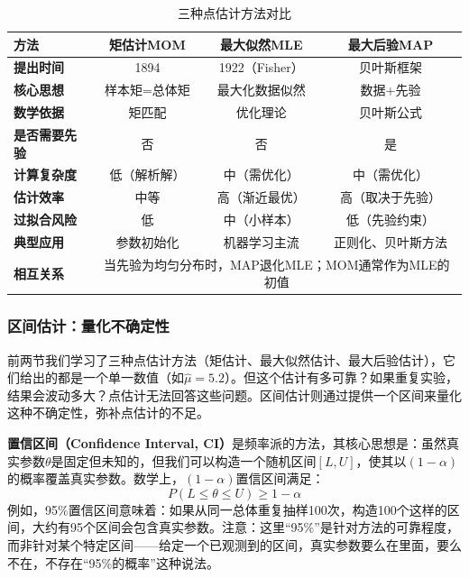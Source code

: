 \begin{table}[htbp]
\centering
\caption{三种点估计方法对比}
\label{tab:三种点估计方法对比}
\begin{tabular}{l|ccc}
\hline
\textbf{方法} & \textbf{矩估计MOM} & \textbf{最大似然MLE} & \textbf{最大后验MAP} \\
\hline
\textbf{提出时间} & 1894 & 1922（Fisher） & 贝叶斯框架 \\
\textbf{核心思想} & 样本矩=总体矩 & 最大化数据似然 & 数据+先验 \\
\textbf{数学依据} & 矩匹配 & 优化理论 & 贝叶斯公式 \\
\textbf{是否需要先验} & 否 & 否 & 是 \\
\textbf{计算复杂度} & 低（解析解） & 中（需优化） & 中（需优化） \\
\textbf{估计效率} & 中等 & 高（渐近最优） & 高（取决于先验） \\
\textbf{过拟合风险} & 低 & 中（小样本） & 低（先验约束） \\
\textbf{典型应用} & 参数初始化 & 机器学习主流 & 正则化、贝叶斯方法 \\
\hline
\textbf{相互关系} & \multicolumn{3}{c}{当先验为均匀分布时，MAP退化MLE；MOM通常作为MLE的初值} \\
\hline
\end{tabular}
\end{table}

\subsubsection{区间估计：量化不确定性}

前两节我们学习了三种点估计方法（矩估计、最大似然估计、最大后验估计），它们给出的都是一个单一数值（如$\hat{\mu}=5.2$）。但这个估计有多可靠？如果重复实验，结果会波动多大？点估计无法回答这些问题。区间估计则通过提供一个区间来量化这种不确定性，弥补点估计的不足。

\textbf{置信区间（Confidence Interval, CI）}是频率派的方法，其核心思想是：虽然真实参数$\theta$是固定但未知的，但我们可以构造一个随机区间$[L, U]$，使其以$(1-\alpha)$的概率覆盖真实参数。数学上，$(1-\alpha)$置信区间满足：
\begin{equation}
P(L \leq \theta \leq U) \geq 1-\alpha
\end{equation}
例如，95\%置信区间意味着：如果从同一总体重复抽样100次，构造100个这样的区间，大约有95个区间会包含真实参数。注意：这里``95\%''是针对方法的可靠程度，而非针对某个特定区间——给定一个已观测到的区间，真实参数要么在里面，要么不在，不存在``95\%的概率''这种说法。

